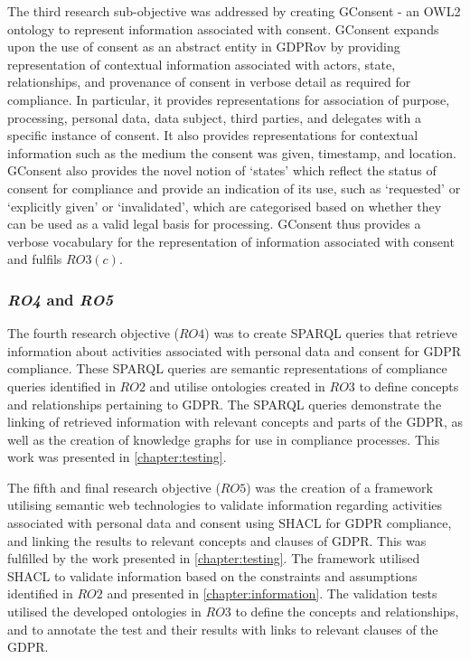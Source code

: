 The third research sub-objective was addressed by creating GConsent - an OWL2 ontology to represent information associated with consent. GConsent expands upon the use of consent as an abstract entity in GDPRov by providing representation of contextual information associated with actors, state, relationships, and provenance of consent in verbose detail as required for compliance. In particular, it provides representations for association of purpose, processing, personal data, data subject, third parties, and delegates with a specific instance of consent. It also provides representations for contextual information such as the medium the consent was given, timestamp,  and location. GConsent also provides the novel notion of `states' which reflect the status of consent for compliance and provide an indication of its use, such as `requested' or `explicitly given' or `invalidated', which are categorised based on whether they can be used as a valid legal basis for processing. GConsent thus provides a verbose vocabulary for the representation of information associated with consent and fulfils $RO3(c)$.

\subsubsection*{\textit{RO4} and \textit{RO5}}
The fourth research objective ($RO4$) was to create SPARQL queries that retrieve information about activities associated with personal data and consent for GDPR compliance. These SPARQL queries are semantic representations of compliance queries identified in $RO2$ and utilise ontologies created in $RO3$ to define concepts and relationships pertaining to GDPR. The SPARQL queries demonstrate the linking of retrieved information with relevant concepts and parts of the GDPR, as well as the creation of knowledge graphs for use in compliance processes. This work was presented in \autoref{chapter:testing}.

The fifth and final research objective ($RO5$) was the creation of a framework utilising semantic web technologies to validate information regarding activities associated with personal data and consent using SHACL for GDPR compliance, and linking the results to relevant concepts and clauses of GDPR. This was fulfilled by the work presented in \autoref{chapter:testing}.
The framework utilised SHACL to validate information based on the constraints and assumptions identified in $RO2$ and presented in \autoref{chapter:information}.
The validation tests utilised the developed ontologies in $RO3$ to define the concepts and relationships, and to annotate the test and their results with links to relevant clauses of the GDPR.

